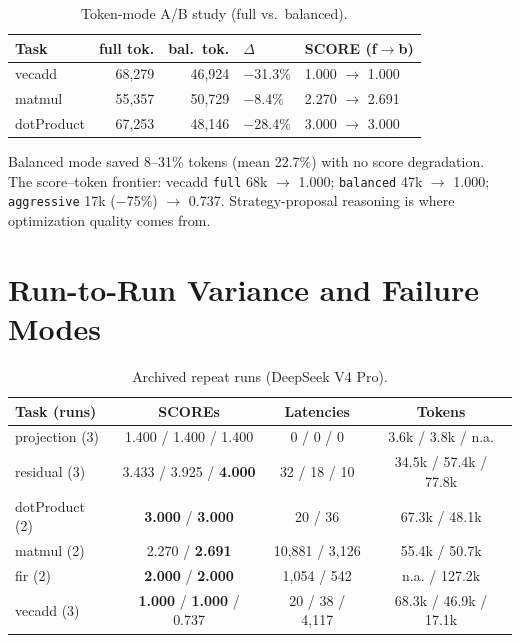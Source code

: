 \documentclass[10pt,conference,letterpaper]{IEEEtran}
\begin{document}
\begin{table}[h]
\centering
\caption{Token-mode A/B study (full vs.\ balanced).}
\label{tab:ab}
\small
\begin{tabular}{lrrll}
\toprule
\textbf{Task} & \textbf{full tok.} & \textbf{bal.\ tok.} & \textbf{$\Delta$} & \textbf{SCORE (f$\to$b)} \\
\midrule
vecadd & 68,279 & 46,924 & $-$31.3\% & 1.000 $\to$ 1.000 \\
matmul & 55,357 & 50,729 & $-$8.4\% & 2.270 $\to$ 2.691 \\
dotProduct & 67,253 & 48,146 & $-$28.4\% & 3.000 $\to$ 3.000 \\
\bottomrule
\end{tabular}
\end{table}

Balanced mode saved 8--31\% tokens (mean 22.7\%) with no score degradation. The score--token frontier: vecadd \texttt{full} 68k $\to$ 1.000; \texttt{balanced} 47k $\to$ 1.000; \texttt{aggressive} 17k ($-$75\%) $\to$ 0.737. Strategy-proposal reasoning is where optimization quality comes from.

\section{Run-to-Run Variance and Failure Modes}
\label{app:variance}

\begin{table}[h]
\centering
\caption{Archived repeat runs (DeepSeek V4 Pro).}
\label{tab:variance}
\footnotesize
\begin{tabular}{lccc}
\toprule
\textbf{Task (runs)} & \textbf{SCOREs} & \textbf{Latencies} & \textbf{Tokens} \\
\midrule
projection (3) & 1.400 / 1.400 / 1.400 & 0 / 0 / 0 & 3.6k / 3.8k / n.a. \\
residual (3) & 3.433 / 3.925 / \textbf{4.000} & 32 / 18 / 10 & 34.5k / 57.4k / 77.8k \\
dotProduct (2) & \textbf{3.000} / \textbf{3.000} & 20 / 36 & 67.3k / 48.1k \\
matmul (2) & 2.270 / \textbf{2.691} & 10,881 / 3,126 & 55.4k / 50.7k \\
fir (2) & \textbf{2.000} / \textbf{2.000} & 1,054 / 542 & n.a. / 127.2k \\
vecadd (3) & \textbf{1.000} / \textbf{1.000} / 0.737 & 20 / 38 / 4,117 & 68.3k / 46.9k / 17.1k \\
\bottomrule
\end{tabular}
\end{table}
\end{document}
